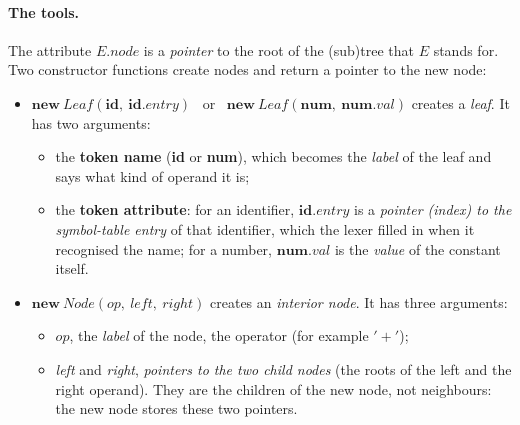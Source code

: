 \documentclass[11pt,a4paper]{article}
\newcommand{\at}[2]{\ensuremath{#1.\mathit{#2}}}
\newcommand{\tok}[1]{\ensuremath{\mathtt{#1}}}
\begin{document}
\paragraph{The tools.} The attribute \at{E}{node} is a \emph{pointer} to the root of the (sub)tree that $E$ stands for. Two constructor functions create nodes and return a pointer to the new node:
\begin{itemize}[nosep]
\item $\mathbf{new}\ \mathit{Leaf}(\mathbf{id},\ \at{\mathbf{id}}{entry})$ \ or \ $\mathbf{new}\ \mathit{Leaf}(\mathbf{num},\ \at{\mathbf{num}}{val})$ creates a \emph{leaf}. It has two arguments:
 \begin{itemize}[nosep]
 \item the \textbf{token name} (\textbf{id} or \textbf{num}), which becomes the \emph{label} of the leaf and says what kind of operand it is;
 \item the \textbf{token attribute}: for an identifier, $\at{\mathbf{id}}{entry}$ is a \emph{pointer (index) to the symbol-table entry} of that identifier, which the lexer filled in when it recognised the name; for a number, $\at{\mathbf{num}}{val}$ is the \emph{value} of the constant itself.
 \end{itemize}
\item $\mathbf{new}\ \mathit{Node}(op,\ \mathit{left},\ \mathit{right})$ creates an \emph{interior node}. It has three arguments:
 \begin{itemize}[nosep]
 \item $op$, the \emph{label} of the node, the operator (for example $\tok{'+'}$);
 \item \textit{left} and \textit{right}, \emph{pointers to the two child nodes} (the roots of the left and the right operand). They are the children of the new node, not neighbours: the new node stores these two pointers.
 \end{itemize}
\end{itemize}
\end{document}

